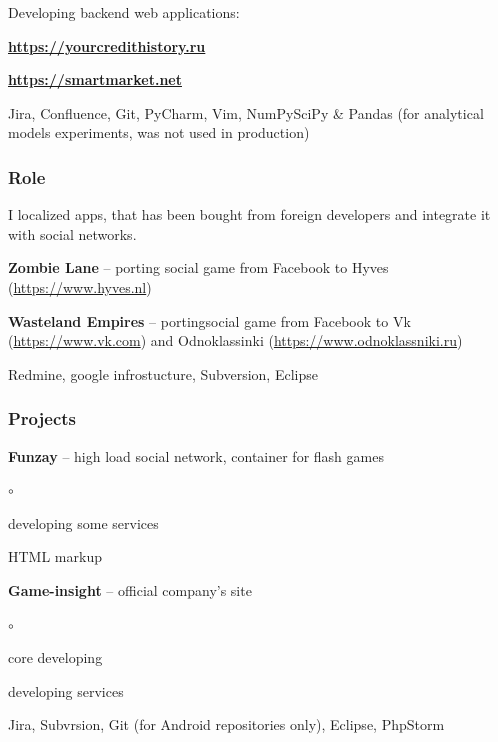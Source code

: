 \documentclass{cv}
\begin{document}
    \gaa
      Developing backend web applications:
      \begin{bulist}
        \item \textbf{\url{https://yourcredithistory.ru}}
        \item \textbf{\url{https://smartmarket.net}}
      \end{bulist}
    \devtools
      Jira, Confluence, Git, PyCharm, Vim, NumPy\/SciPy \& Pandas (for
      analytical models experiments, was not used in production)

    \subsubsection* {Role}
      I localized apps, that has been bought from foreign developers and
      integrate it with social networks.
    \begin{gaas}
      \item \textbf{Zombie Lane} -- porting social game from Facebook to
        Hyves (\url{https://www.hyves.nl})
      \item \textbf{Wasteland Empires} -- portingsocial game from Facebook to
        Vk (\url{https://www.vk.com}) and Odnoklassinki
        (\url{https://www.odnoklassniki.ru})
    \end{gaas}
    \devtools
      Redmine, google infrostucture, Subversion, Eclipse

    \subsubsection* {Projects}
      \begin{bulist}
        \item \textbf{Funzay} -- high load social network, container for flash
          games
          \begin{list}{$\circ$}{}
            \item developing some services
            \item HTML markup 
          \end{list} 
        \item \textbf{Game-insight} -- official company's site
          \begin{list}{$\circ$}{}
            \item core developing
            \item developing services
          \end{list}
      \end{bulist}
    \devtools
      Jira, Subvrsion, Git (for Android repositories only), Eclipse, PhpStorm
\end{document}
